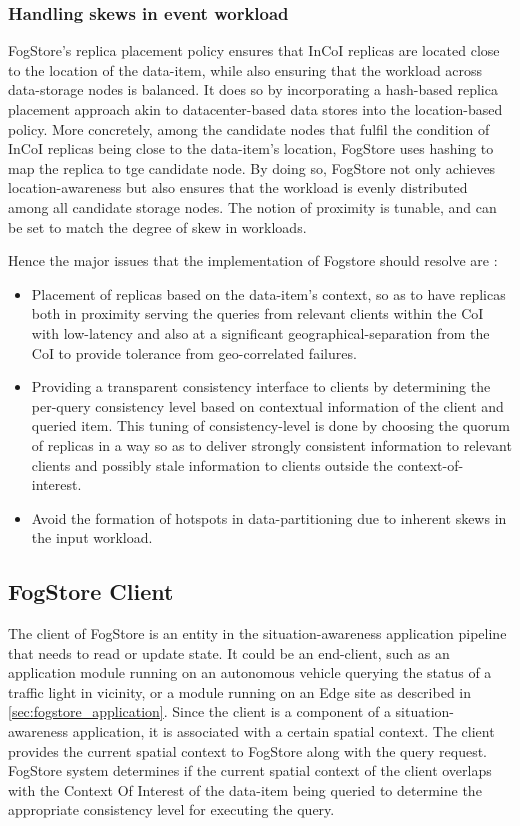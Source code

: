 \subsubsection{Handling skews in event workload}
FogStore's replica placement policy ensures that InCoI replicas are located close to the location of the data-item, while also ensuring that the workload across data-storage nodes is balanced. It does so by incorporating a hash-based replica placement approach akin to datacenter-based data stores into the location-based policy. More concretely, among the candidate nodes that fulfil the condition of InCoI replicas being close to the data-item's location, FogStore uses hashing to map the replica to tge candidate node. By doing so, FogStore not only achieves location-awareness but also ensures that the workload is evenly distributed among all candidate storage nodes. The notion of proximity is tunable, and can be set to match the degree of skew in workloads.

\par Hence the major issues that the implementation of Fogstore should resolve are :
\begin{itemize}
\item Placement of replicas based on the data-item's context, so as to have replicas both in proximity serving the queries from relevant clients within the CoI with low-latency and also at a significant geographical-separation from the CoI to provide tolerance from geo-correlated failures.
\item Providing a transparent consistency interface to clients by determining the per-query consistency level based on contextual information of the client and queried item. This tuning of consistency-level is done by choosing the quorum of replicas in a way so as to deliver strongly consistent information to relevant clients and possibly stale information to clients outside the context-of-interest.
\item Avoid the formation of hotspots in data-partitioning due to inherent skews in the input workload.
\end{itemize}

\subsection{FogStore Client}
The client of FogStore is an entity in the situation-awareness application pipeline that needs to read or update state. It could be an end-client, such as an application module running on an autonomous vehicle querying the status of a traffic light in vicinity, or a module running on an Edge site as described in \cref{sec:fogstore_application}. Since the client is a component of a situation-awareness application, it is associated with a certain spatial context. The client provides the current spatial context to FogStore along with the query request. FogStore system determines if the current spatial context of the client overlaps with  the Context Of Interest of the data-item being queried to determine the appropriate consistency level for executing the query.

